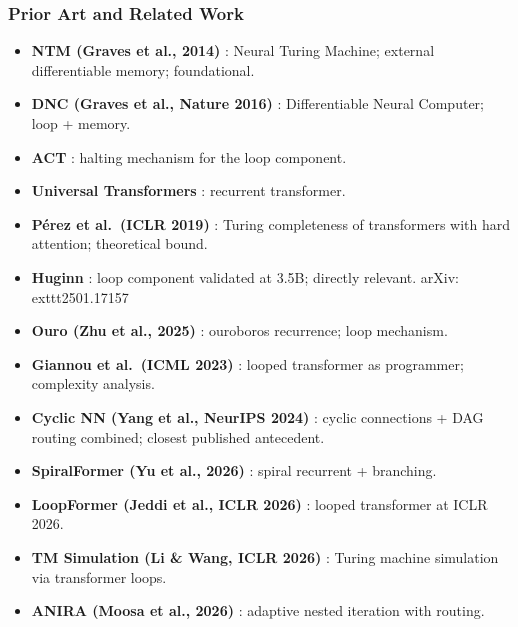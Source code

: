 \documentclass[11pt]{article}
\begin{document}
\subsubsection*{Prior Art and Related Work}
\begin{itemize}
  \item \textbf{NTM (Graves et al., 2014)} \cite{GravesEtAl2014NTM}: Neural Turing Machine; external differentiable memory; foundational.

  \item \textbf{DNC (Graves et al., Nature 2016)} \cite{GravesEtAl2016DNC}: Differentiable Neural Computer; loop + memory.

  \item \textbf{ACT} \cite{Graves2016}: halting mechanism for the loop component.

  \item \textbf{Universal Transformers} \cite{DehghaniEtAl2019}: recurrent transformer.

  \item \textbf{P\'{e}rez et al.\ (ICLR 2019)} \cite{PerezEtAl2019}: Turing completeness of transformers with hard attention; theoretical bound.

  \item \textbf{Huginn} \cite{GeipingEtAl2025}: loop component validated at 3.5B; directly relevant.
    arXiv:	exttt{2501.17157}

  \item \textbf{Ouro (Zhu et al., 2025)} \cite{ZhuEtAl2025Ouro}: ouroboros recurrence; loop mechanism.

  \item \textbf{Giannou et al.\ (ICML 2023)} \cite{GiannouEtAl2023}: looped transformer as programmer; complexity analysis.

  \item \textbf{Cyclic NN (Yang et al., NeurIPS 2024)} \cite{YangEtAl2024CyclicNN}: cyclic connections + DAG routing combined; closest published antecedent.

  \item \textbf{SpiralFormer (Yu et al., 2026)} \cite{YuEtAl2026}: spiral recurrent + branching.

  \item \textbf{LoopFormer (Jeddi et al., ICLR 2026)} \cite{JeddiEtAl2026}: looped transformer at ICLR 2026.

  \item \textbf{TM Simulation (Li \& Wang, ICLR 2026)} \cite{LiWang2026}: Turing machine simulation via transformer loops.

  \item \textbf{ANIRA (Moosa et al., 2026)} \cite{MoosaEtAl2026}: adaptive nested iteration with routing.
\end{itemize}
\end{document}
